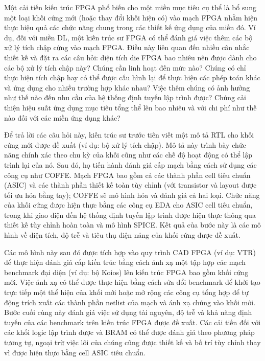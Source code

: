 \documentclass[a4paper]{article}
\begin{document}
Một cải tiến kiến trúc FPGA phổ biến cho một miền mục tiêu cụ thể là bổ sung một loại khối cứng mới (hoặc thay đổi khối hiện có) vào mạch FPGA nhằm hiện thực hiệu quả các chức năng chung trong các thiết kế ứng dụng của miền đó. Ví dụ, đối với miền DL, một kiến trúc sư FPGA có thể đánh giá việc thêm các bộ xử lý tích chập cứng vào mạch FPGA. Điều này liên quan đến nhiều cân nhắc thiết kế và đặt ra các câu hỏi: diện tích die FPGA bao nhiêu nên được dành cho các bộ xử lý tích chập này? Chúng cần linh hoạt đến mức nào? Chúng có chỉ thực hiện tích chập hay có thể được cấu hình lại để thực hiện các phép toán khác và ứng dụng cho nhiều trường hợp khác nhau? Việc thêm chúng có ảnh hưởng như thế nào đến nhu cầu của hệ thống định tuyến lập trình được? Chúng cải thiện hiệu suất ứng dụng mục tiêu tổng thể lên bao nhiêu và với chi phí như thế nào đối với các miền ứng dụng khác?

Để trả lời các câu hỏi này, kiến trúc sư trước tiên viết một mô tả RTL cho khối cứng mới được đề xuất (ví dụ: bộ xử lý tích chập). Mô tả này trình bày chức năng chính xác theo chu kỳ của khối cũng như các chế độ hoạt động có thể lập trình lại của nó. Sau đó, họ tiến hành đánh giá cấp mạch bằng cách sử dụng các công cụ như COFFE. Mạch FPGA bao gồm cả các thành phần cell tiêu chuẩn (ASIC) và các thành phần thiết kế toàn tùy chỉnh (với transistor và layout được tối ưu hóa bằng tay); COFFE sẽ mô hình hóa và đánh giá cả hai loại. Chức năng của khối cứng được hiện thực bằng các công cụ EDA cho ASIC cell tiêu chuẩn, trong khi giao diện đến hệ thống định tuyến lập trình được hiện thực thông qua thiết kế tùy chỉnh hoàn toàn và mô hình SPICE. Kết quả của bước này là các mô hình về diện tích, độ trễ và tiêu thụ điện năng của khối cứng được đề xuất.

Các mô hình này sau đó được tích hợp vào quy trình CAD FPGA (ví dụ: VTR) để thực hiện đánh giá cấp kiến trúc bằng cách ánh xạ một tập hợp các mạch benchmark đại diện (ví dụ: bộ Koios) lên kiến trúc FPGA bao gồm khối cứng mới. Việc ánh xạ có thể được thực hiện bằng cách sửa đổi benchmark để khởi tạo trực tiếp một thể hiện của khối mới hoặc mở rộng các công cụ tổng hợp để tự động trích xuất các thành phần netlist của mạch và ánh xạ chúng vào khối mới. Bước cuối cùng này đánh giá việc sử dụng tài nguyên, độ trễ và khả năng định tuyến của các benchmark trên kiến trúc FPGA được đề xuất. Các cải tiến đối với các khối logic lập trình được và BRAM có thể được đánh giá theo phương pháp tương tự, ngoại trừ việc lõi của chúng cũng được thiết kế và bố trí tùy chỉnh thay vì được hiện thực bằng cell ASIC tiêu chuẩn.
\end{document}

